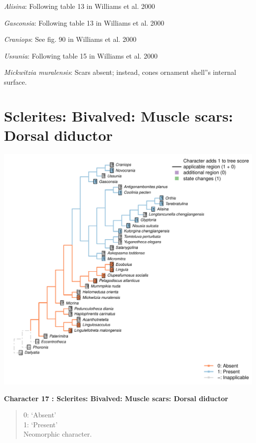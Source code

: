 \documentclass[]{book}
\theoremstyle{definition}
\theoremstyle{definition}
\theoremstyle{definition}
\theoremstyle{remark}
\begin{document}
\emph{Alisina}: Following table 13 in Williams et al. 2000

\emph{Gasconsia}: Following table 13 in Williams et al. 2000

\emph{Craniops}: See fig. 90 in Williams et al. 2000

\emph{Ussunia}: Following table 15 in Williams et al. 2000

\emph{Mickwitzia muralensis}: Scars absent; instead, cones ornament
shell''s internal surface.

\hypertarget{sclerites-bivalved-muscle-scars-dorsal-diductor}{%
\section*{Sclerites: Bivalved: Muscle scars: Dorsal
diductor}\label{sclerites-bivalved-muscle-scars-dorsal-diductor}}

\includegraphics{Brachiopod_phylogeny_files/figure-latex/unnamed-chunk-5-17.pdf}

\textbf{Character 17 : Sclerites: Bivalved: Muscle scars: Dorsal
diductor }

\begin{quote}
0: `Absent'\\
1: `Present'\\
Neomorphic character.
\end{quote}
\end{document}
